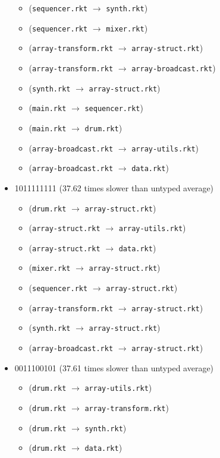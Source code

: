 \documentclass{article}
\newcommand{\mono}[1]{\texttt{#1}}
\begin{document}
\begin{itemize}
\begin{itemize}
  \item (\mono{sequencer.rkt} $\rightarrow$ \mono{synth.rkt})
  \item (\mono{sequencer.rkt} $\rightarrow$ \mono{mixer.rkt})
  \item (\mono{array-transform.rkt} $\rightarrow$ \mono{array-struct.rkt})
  \item (\mono{array-transform.rkt} $\rightarrow$ \mono{array-broadcast.rkt})
  \item (\mono{synth.rkt} $\rightarrow$ \mono{array-struct.rkt})
  \item (\mono{main.rkt} $\rightarrow$ \mono{sequencer.rkt})
  \item (\mono{main.rkt} $\rightarrow$ \mono{drum.rkt})
  \item (\mono{array-broadcast.rkt} $\rightarrow$ \mono{array-utils.rkt})
  \item (\mono{array-broadcast.rkt} $\rightarrow$ \mono{data.rkt})
  \end{itemize}
\item 1011111111 (37.62 times slower than untyped average)
  \begin{itemize}
  \item (\mono{drum.rkt} $\rightarrow$ \mono{array-struct.rkt})
  \item (\mono{array-struct.rkt} $\rightarrow$ \mono{array-utils.rkt})
  \item (\mono{array-struct.rkt} $\rightarrow$ \mono{data.rkt})
  \item (\mono{mixer.rkt} $\rightarrow$ \mono{array-struct.rkt})
  \item (\mono{sequencer.rkt} $\rightarrow$ \mono{array-struct.rkt})
  \item (\mono{array-transform.rkt} $\rightarrow$ \mono{array-struct.rkt})
  \item (\mono{synth.rkt} $\rightarrow$ \mono{array-struct.rkt})
  \item (\mono{array-broadcast.rkt} $\rightarrow$ \mono{array-struct.rkt})
  \end{itemize}
\item 0011100101 (37.61 times slower than untyped average)
  \begin{itemize}
  \item (\mono{drum.rkt} $\rightarrow$ \mono{array-utils.rkt})
  \item (\mono{drum.rkt} $\rightarrow$ \mono{array-transform.rkt})
  \item (\mono{drum.rkt} $\rightarrow$ \mono{synth.rkt})
  \item (\mono{drum.rkt} $\rightarrow$ \mono{data.rkt})

\end{itemize}
\end{itemize}
\end{document}
